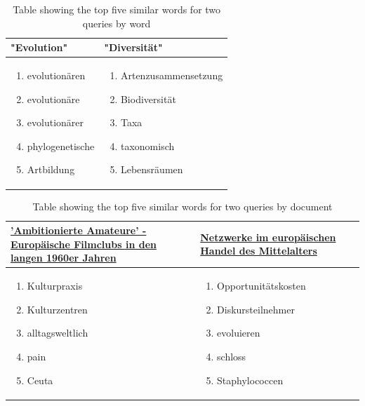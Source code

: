 \begin{table}
	\centering
	\begin{tabular}{ p{6cm} | p{6cm} }
		"Evolution" & "Diversität" \\ \hline
		\begin{enumerate}
			\item evolutionären
			\item evolutionäre
			\item evolutionärer
			\item phylogenetische
			\item Artbildung
		\end{enumerate} & 
		\begin{enumerate}
			\item Artenzusammensetzung
			\item Biodiversität
			\item Taxa
			\item taxonomisch
			\item Lebensräumen
		\end{enumerate} \\
	\end{tabular}
	\caption{\label{tab:semantic_connectivity_words} Table showing the top five similar words for two queries by word}
\end{table}

\begin{table}
	\centering
	\begin{tabular}{ p{6cm} | p{6cm} }
		\href{https://gepris.dfg.de/gepris/projekt/387798678}{'Ambitionierte Amateure' - Europäische Filmclubs in den langen 1960er Jahren} & \href{https://gepris.dfg.de/gepris/projekt/160874660}{Netzwerke im europäischen Handel des Mittelalters} \\ \hline
		\begin{enumerate}
			\item Kulturpraxis
			\item Kulturzentren
			\item alltagsweltlich
			\item pain
			\item Ceuta
		\end{enumerate} & 
		\begin{enumerate}
			\item Opportunitätskosten
			\item Diskursteilnehmer
			\item evoluieren
			\item schloss
			\item Staphylococcen
		\end{enumerate} \\
	\end{tabular}
	\caption{\label{tab:semantic_connectivity_docs} Table showing the top five similar words for two queries by document}
\end{table}

